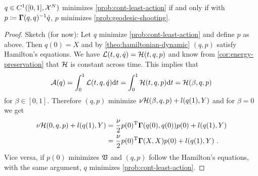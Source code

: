 \begin{theorem}
\label{theo:geodesic-shooting}
	$q \in C^1([0, 1], \mathcal{X}^N)$ minimizes \cref{prob:cont-least-action} if and only if with $p\coloneqq \mathbf{\Gamma}(q, q)^{-1}\dot{q}$, $p$ minimizes \cref{prob:geodesic-shooting}.
\end{theorem}
\begin{proof}
	Sketch (for now):
	Let $q$ minimize \cref{prob:cont-least-action} and define $p$ as above.
	Then $q(0) = X$ and by \cref{theo:hamiltonian-dynamic} $(q, p)$ satisfy Hamilton's equations.
	We have $\mathcal{L}(t, q, \dot{q}) = \mathcal{H}(t, q, p)$ and know from \cref{cor:energy-preservation} that $\mathcal{H}$ is constant across time.
	This implies that
	\begin{equation}
		\mathcal{A}(q) = \int_{0}^{1} \mathcal{L}(t, q, \dot{q}) \mathrm{d}t 
		= \int_{0}^{1} \mathcal{H}(t, q, p) \mathrm{d}t = \mathcal{H}(\beta, q, p)
	\end{equation}
	for $\beta \in [0, 1]$.
	Therefore $(q, p)$ minimize $\nu \mathcal{H}(\beta, q, p) + l(q(1), Y)$ and for $\beta = 0$ we get
	\begin{align}
		\nu \mathcal{H}(0, q, p) + l(q(1), Y) &= \frac{\nu}{2} p(0)^{\mathrm{T}} \mathbf{\Gamma}(q(0), q(0))p(0) + l(q(1), Y)\\
		&= \frac{\nu}{2} p(0)^{\mathrm{T}} \mathbf{\Gamma}(X, X)p(0) + l(q(1), Y) \ .
	\end{align}
	Vice versa, if $p(0)$ minimizes $\mathfrak{V}$ and $(q, p)$ follow the Hamilton's equations, with the same argument, $q$ minimizes \cref{prob:cont-least-action}.
\end{proof}